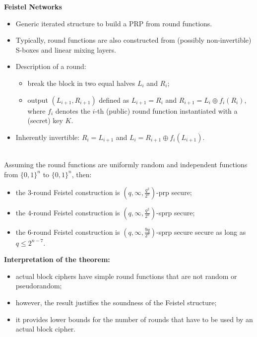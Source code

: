 \textbf{Feistel Networks}
\begin{itemize}
    \item Generic iterated structure to build a PRP from round functions.
    \item Typically, round functions are also constructed from (possibly non-invertible) S-boxes and linear mixing layers.
    \item Description of a round:
    \begin{itemize}
        \item break the block in two equal halves $L_i$ and $R_i$;
        \item output $(L_{i+1},R_{i+1})$ defined as $L_{i+1} = R_i$ and $R_{i+1} = L_i \oplus f_i(R_i)$, where $f_i$ denotes the $i$-th (public) round function instantiated with a (secret) key $K$.
    \end{itemize}
    \item Inherently invertible: $R_i = L_{i+1}$ and $L_i = R_{i+1} \oplus f_i(L_{i+1})$.\newline
\end{itemize}


\begin{theorem}\ \\
Assuming the round functions are uniformly random and independent
functions from $\{0,1\}^n$ to $\{0,1\}^n$, then:
\begin{itemize}
    \item the $3$-round Feistel construction is $(q,\infty,\frac{q^2}{2^n})$-prp secure;
    \item the $4$-round Feistel construction is $(q,\infty,\frac{q^2}{2^n})$-sprp secure;
    \item the $6$-round Feistel construction is $(q,\infty,\frac{9q}{2^n})$-sprp secure secure as long as $q \leq 2^{n-7}$.\newline
\end{itemize}

\textbf{Interpretation of the theorem:}
\begin{itemize}
    \item actual block ciphers have simple round functions that are not random or pseudorandom;
    \item however, the result justifies the soundness of the Feistel structure;
    \item it provides lower bounds for the number of rounds that have to be used by an actual block cipher.\newline
\end{itemize}
\end{theorem}


